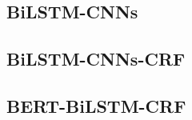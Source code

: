 \documentclass[a4paper,UTF8,no-math]{ctexart}
\begin{document}
	\subsection{BiLSTM-CNNs}
	
	\citep{chiu2016named}
	
	\subsection{BiLSTM-CNNs-CRF}
	
	\citep{ma2016end}

	\subsection{BERT-BiLSTM-CRF}
	
	\citep{devlin2018bert}
	
	\newpage
	
    
\end{document}

